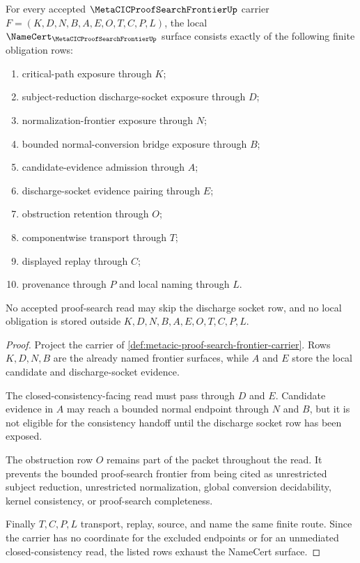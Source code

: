 \begin{theorem}
\label{thm:metacic-proof-search-frontier-namecert-obligations}
For every accepted $\MetaCICProofSearchFrontierUp$ carrier $F=(K,D,N,B,A,E,O,T,C,P,L)$, the local $\NameCert_{\MetaCICProofSearchFrontierUp}$ surface consists exactly of the following finite obligation rows:
\begin{enumerate}
\item critical-path exposure through $K$;
\item subject-reduction discharge-socket exposure through $D$;
\item normalization-frontier exposure through $N$;
\item bounded normal-conversion bridge exposure through $B$;
\item candidate-evidence admission through $A$;
\item discharge-socket evidence pairing through $E$;
\item obstruction retention through $O$;
\item componentwise transport through $T$;
\item displayed replay through $C$;
\item provenance through $P$ and local naming through $L$.
\end{enumerate}
No accepted proof-search read may skip the discharge socket row, and no local obligation is stored outside $K,D,N,B,A,E,O,T,C,P,L$.
\end{theorem}
\begin{proof}
Project the carrier of \autoref{def:metacic-proof-search-frontier-carrier}. Rows $K,D,N,B$ are the already named frontier surfaces, while $A$ and $E$ store the local candidate and discharge-socket evidence.

The closed-consistency-facing read must pass through $D$ and $E$. Candidate evidence in $A$ may reach a bounded normal endpoint through $N$ and $B$, but it is not eligible for the consistency handoff until the discharge socket row has been exposed.

The obstruction row $O$ remains part of the packet throughout the read. It prevents the bounded proof-search frontier from being cited as unrestricted subject reduction, unrestricted normalization, global conversion decidability, kernel consistency, or proof-search completeness.

Finally $T,C,P,L$ transport, replay, source, and name the same finite route. Since the carrier has no coordinate for the excluded endpoints or for an unmediated closed-consistency read, the listed rows exhaust the NameCert surface.
\end{proof}

